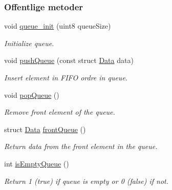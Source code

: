 \subsubsection*{Offentlige metoder}
\begin{DoxyCompactItemize}
\item 
void \hyperlink{class_queue_a2f53f032b89a2e6f1906a3d7aef99df3}{queue\+\_\+init} (uint8 queue\+Size)
\begin{DoxyCompactList}\small\item\em Initialize queue. \end{DoxyCompactList}\item 
void \hyperlink{class_queue_a0a8b5d336192563403043ec13ab653db}{push\+Queue} (const struct \hyperlink{queue_8h_struct_data}{Data} data)
\begin{DoxyCompactList}\small\item\em Insert element in F\+I\+FO ordre in queue. \end{DoxyCompactList}\item 
void \hyperlink{class_queue_a9ecab9ecdedfc331aed9a0ae63ce193b}{pop\+Queue} ()
\begin{DoxyCompactList}\small\item\em Remove front element of the queue. \end{DoxyCompactList}\item 
struct \hyperlink{queue_8h_struct_data}{Data} \hyperlink{class_queue_ad9db61946726aa012867eb9947a4597b}{front\+Queue} ()
\begin{DoxyCompactList}\small\item\em Return data from the front element in the queue. \end{DoxyCompactList}\item 
int \hyperlink{class_queue_a0a59d535179c225aa8a08eab5967e80b}{is\+Empty\+Queue} ()
\begin{DoxyCompactList}\small\item\em Return 1 (true) if queue is empty or 0 (false) if not. \end{DoxyCompactList}\end{DoxyCompactItemize}
